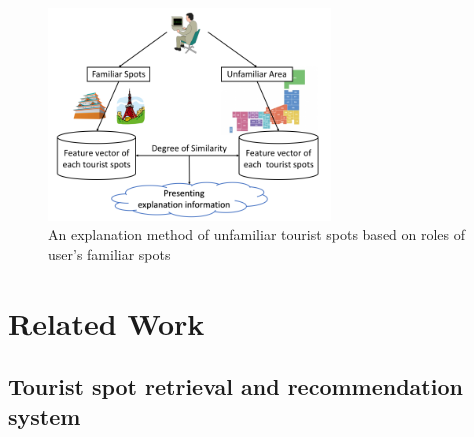 \documentclass[journal]{IAENGtran}
\begin{document}
\begin{figure}[t]
  \begin{center}
    \includegraphics[clip,width=7.5cm,bb=0 0 720 540]{picture/Photo_Image_eng.png}
    \caption{An explanation method of unfamiliar tourist spots based on roles of user's familiar spots}
    \label{fig:Photo_Image}
   \end{center}
\end{figure}

\section{Related Work}
\label{sec:Related Work}
\subsection{Tourist spot retrieval and recommendation system}
\label{subsec:Tourist spot retrieval and recommendation system}
\end{document}
